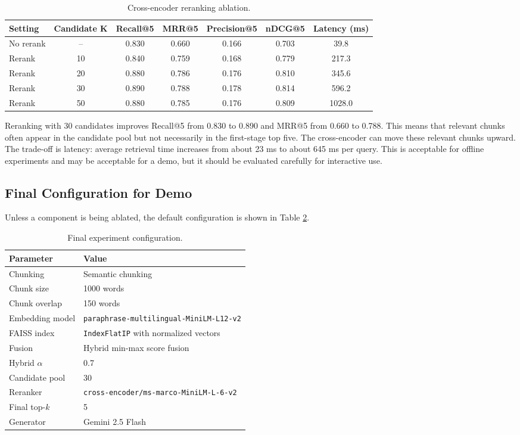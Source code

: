 \documentclass[11pt,a4paper]{article}
\begin{document}
\begin{table}[H]
\centering
\caption{Cross-encoder reranking ablation.}
\label{tab:reranker}
\begin{tabular}{lcccccc}
\toprule
Setting & Candidate K & Recall@5 & MRR@5 & Precision@5 & nDCG@5 & Latency (ms) \\
\midrule
No rerank & -- & 0.830 & 0.660 & 0.166 & 0.703 & 39.8 \\
Rerank & 10 & 0.840 & 0.759 & 0.168 & 0.779 & 217.3 \\
Rerank & 20 & 0.880 & 0.786 & 0.176 & 0.810 & 345.6 \\
Rerank & 30 & 0.890 & 0.788 & 0.178 & 0.814 & 596.2 \\
Rerank & 50 & 0.880 & 0.785 & 0.176 & 0.809 & 1028.0 \\
\bottomrule
\end{tabular}
\end{table}


Reranking with 30 candidates improves Recall@5 from 0.830 to 0.890 and MRR@5
from 0.660 to 0.788. This means that relevant chunks often appear in the
candidate pool but not necessarily in the first-stage top five. The
cross-encoder can move these relevant chunks upward. The trade-off is latency:
average retrieval time increases from about 23 ms to about 645 ms per query.
This is acceptable for offline experiments and may be acceptable for a demo, but
it should be evaluated carefully for interactive use.

\subsection{Final Configuration for Demo}

Unless a component is being ablated, the default configuration is shown in
Table \ref{tab:final-config}.

\begin{table}[H]
\centering
\caption{Final experiment configuration.}
\label{tab:final-config}
\begin{tabular}{ll}
\toprule
Parameter & Value \\
\midrule
Chunking & Semantic chunking \\
Chunk size & 1000 words \\
Chunk overlap & 150 words \\
Embedding model & \texttt{paraphrase-multilingual-MiniLM-L12-v2} \\
FAISS index & \texttt{IndexFlatIP} with normalized vectors \\
Fusion & Hybrid min-max score fusion \\
Hybrid $\alpha$ & 0.7 \\
Candidate pool & 30 \\
Reranker & \texttt{cross-encoder/ms-marco-MiniLM-L-6-v2} \\
Final top-$k$ & 5 \\
Generator & Gemini 2.5 Flash \\
\bottomrule
\end{tabular}
\end{table}
\end{document}
